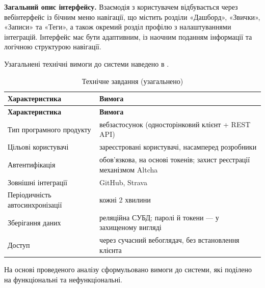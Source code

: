 \textbf{Загальний опис інтерфейсу.} Взаємодія з користувачем відбувається через вебінтерфейс із бічним меню навігації, що містить розділи «Дашборд», «Звички», «Записи» та «Теги», а також окремий розділ профілю з налаштуваннями інтеграцій. Інтерфейс має бути адаптивним, із наочним поданням інформації та логічною структурою навігації.

Узагальнені технічні вимоги до системи наведено в .

\needspace{7cm}
\begin{spacing}{1.2}
    \footnotesize
    \noindent
    \begin{xltabular}{\textwidth}{| >{\raggedright\arraybackslash}X | >{\raggedright\arraybackslash}X |}
        \caption{Технічне завдання (узагальнено)} \label{tab:tz} \\
        \hline
        \textbf{Характеристика} & \textbf{Вимога} \\ \hline
        \endfirsthead

        \hline
        \textbf{Характеристика} & \textbf{Вимога} \\ \hline
        \endhead

        Тип програмного продукту & вебзастосунок (односторінковий клієнт + REST API) \\ \hline
        Цільові користувачі & зареєстровані користувачі, насамперед розробники \\ \hline
        Автентифікація & обов'язкова, на основі токенів; захист реєстрації механізмом Altcha \\ \hline
        Зовнішні інтеграції & GitHub, Strava \\ \hline
        Періодичність автосинхронізації & кожні 2 хвилини \\ \hline
        Зберігання даних & реляційна СУБД; паролі й токени — у захищеному вигляді \\ \hline
        Доступ & через сучасний вебоглядач, без встановлення клієнта \\ \hline
    \end{xltabular}
\end{spacing}


На основі проведеного аналізу сформульовано вимоги до системи, які поділено на функціональні та нефункціональні.



